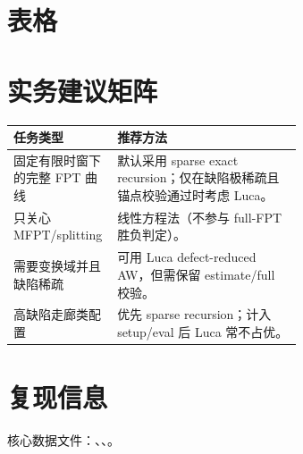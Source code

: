 \documentclass[11pt]{ctexart}
\begin{document}
\section{表格}
\begin{table}[H]
\centering
\small
\caption{按缺陷分箱与时窗分组的运行比摘要。}
\resizebox{\linewidth}{!}{}
\end{table}
\begin{table}[H]
\centering
\small
\caption{锚点配置运行时基线。}
\resizebox{\linewidth}{!}{}
\end{table}
\section{实务建议矩阵}
\begin{table}[H]
\centering
\small
\begin{tabular}{@{}lp{0.64\linewidth}@{}}
\toprule
任务类型 & 推荐方法 \\
\midrule
固定有限时窗下的完整 FPT 曲线 & 默认采用 sparse exact recursion；仅在缺陷极稀疏且锚点校验通过时考虑 Luca。 \\
只关心 MFPT/splitting & 线性方程法（不参与 full-FPT 胜负判定）。 \\
需要变换域并且缺陷稀疏 & 可用 Luca defect-reduced AW，但需保留 estimate/full 校验。 \\
高缺陷走廊类配置 & 优先 sparse recursion；计入 setup/eval 后 Luca 常不占优。 \\
\bottomrule
\end{tabular}
\end{table}
\section{复现信息}
核心数据文件：、、。
\end{document}
